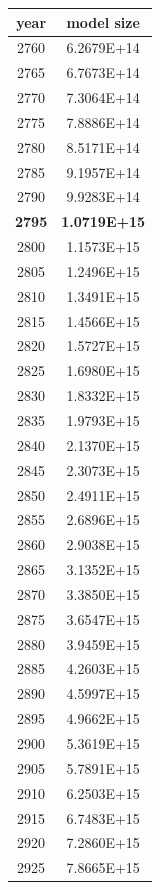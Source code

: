 \documentclass[a4paper]{article}
\begin{document}
    \begin{tabular}{| c | c |}
    	\hline
    	year & model size \\\hline
    	2760 & 6.2679E+14 \\\hline
    	2765 & 6.7673E+14 \\\hline
    	2770 & 7.3064E+14 \\\hline
    	2775 & 7.8886E+14 \\\hline
    	2780 & 8.5171E+14 \\\hline
    	2785 & 9.1957E+14 \\\hline
    	2790 & 9.9283E+14 \\\hline
    	\textbf{2795} & \textbf{1.0719E+15} \\\hline
    	2800 & 1.1573E+15 \\\hline
    	2805 & 1.2496E+15 \\\hline
    	2810 & 1.3491E+15 \\\hline
    	2815 & 1.4566E+15 \\\hline
    	2820 & 1.5727E+15 \\\hline
    	2825 & 1.6980E+15 \\\hline
    	2830 & 1.8332E+15 \\\hline
    	2835 & 1.9793E+15 \\\hline
    	2840 & 2.1370E+15 \\\hline
    	2845 & 2.3073E+15 \\\hline
    	2850 & 2.4911E+15 \\\hline
    	2855 & 2.6896E+15 \\\hline
    	2860 & 2.9038E+15 \\\hline
    	2865 & 3.1352E+15 \\\hline
    	2870 & 3.3850E+15 \\\hline
    	2875 & 3.6547E+15 \\\hline
    	2880 & 3.9459E+15 \\\hline
    	2885 & 4.2603E+15 \\\hline
    	2890 & 4.5997E+15 \\\hline
    	2895 & 4.9662E+15 \\\hline
    	2900 & 5.3619E+15 \\\hline
    	2905 & 5.7891E+15 \\\hline
    	2910 & 6.2503E+15 \\\hline
    	2915 & 6.7483E+15 \\\hline
    	2920 & 7.2860E+15 \\\hline
    	2925 & 7.8665E+15 \\\hline

\end{tabular}
\end{document}
